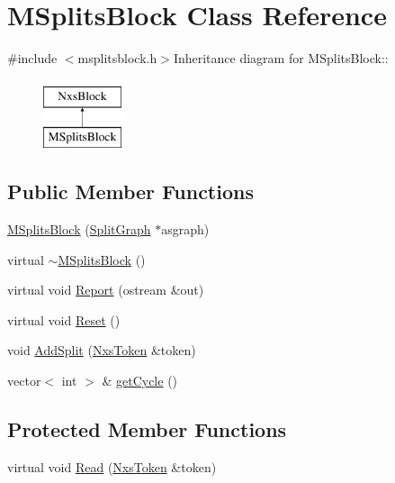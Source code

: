 \hypertarget{classMSplitsBlock}{
\section{MSplitsBlock Class Reference}
\label{classMSplitsBlock}
}


{\ttfamily \#include $<$msplitsblock.h$>$}Inheritance diagram for MSplitsBlock::\begin{figure}[H]
\begin{center}
\leavevmode
\includegraphics[height=2cm]{classMSplitsBlock}
\end{center}
\end{figure}
\subsection*{Public Member Functions}
\begin{DoxyCompactItemize}
\item 
\hyperlink{classMSplitsBlock_a17ec9ef3354fde89163fd1ee6c22d5d6}{MSplitsBlock} (\hyperlink{classSplitGraph}{SplitGraph} $\ast$asgraph)
\item 
virtual \hyperlink{classMSplitsBlock_a214ec1c6f4a93bafc034d58794e0ca52}{$\sim$MSplitsBlock} ()
\item 
virtual void \hyperlink{classMSplitsBlock_a693bbbb86942e0ede5f21e2aa9caf008}{Report} (ostream \&out)
\item 
virtual void \hyperlink{classMSplitsBlock_ab05dcffb5cbb74d05a809e1ca81d7e23}{Reset} ()
\item 
void \hyperlink{classMSplitsBlock_a3f4b4b3afd38d0ddf0dc553836fd9e73}{AddSplit} (\hyperlink{classNxsToken}{NxsToken} \&token)
\item 
vector$<$ int $>$ \& \hyperlink{classMSplitsBlock_a900cb7fe40906072a3cf490ae647c5ce}{getCycle} ()
\end{DoxyCompactItemize}
\subsection*{Protected Member Functions}
\begin{DoxyCompactItemize}
\item 
virtual void \hyperlink{classMSplitsBlock_a4eb9285aac79a0a29bc0f6be59a4b229}{Read} (\hyperlink{classNxsToken}{NxsToken} \&token)
\end{DoxyCompactItemize}

